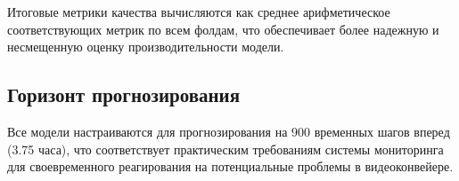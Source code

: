\hspace*{1.25cm}Итоговые метрики качества вычисляются как среднее арифметическое соответствующих метрик по всем фолдам, что обеспечивает более надежную и несмещенную оценку производительности модели.

\subsection{Горизонт прогнозирования}

\hspace*{1.25cm}Все модели настраиваются для прогнозирования на 900 временных шагов вперед (3.75 часа), что соответствует практическим требованиям системы мониторинга для своевременного реагирования на потенциальные проблемы в видеоконвейере. 